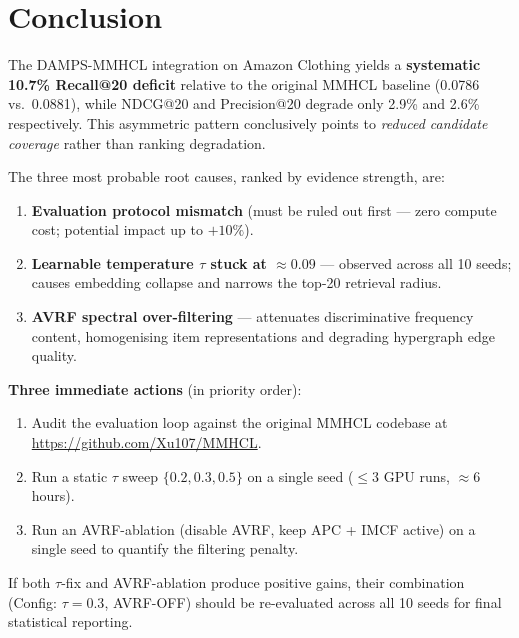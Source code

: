 \documentclass[12pt,a4paper]{article}
\begin{document}
\section{Conclusion}

The DAMPS-MMHCL integration on Amazon Clothing yields a
\textbf{systematic 10.7\% Recall@20 deficit} relative to the original
MMHCL baseline (0.0786 vs.\ 0.0881), while NDCG@20 and Precision@20
degrade only 2.9\% and 2.6\% respectively.  This asymmetric pattern
conclusively points to \emph{reduced candidate coverage} rather than
ranking degradation.

The three most probable root causes, ranked by evidence strength, are:

\begin{enumerate}[leftmargin=*]
  \item \textbf{Evaluation protocol mismatch} (must be ruled out first
        --- zero compute cost; potential impact up to $+10\%$).
  \item \textbf{Learnable temperature $\tau$ stuck at $\approx 0.09$}
        --- observed across all 10 seeds; causes embedding collapse and
        narrows the top-20 retrieval radius.
  \item \textbf{AVRF spectral over-filtering} --- attenuates
        discriminative frequency content, homogenising item
        representations and degrading hypergraph edge quality.
\end{enumerate}

\textbf{Three immediate actions} (in priority order):
\begin{enumerate}[leftmargin=*]
  \item Audit the evaluation loop against the original MMHCL codebase at
        \url{https://github.com/Xu107/MMHCL}.
  \item Run a static $\tau$ sweep $\{0.2, 0.3, 0.5\}$ on a single seed
        ($\leq 3$ GPU runs, $\approx 6$ hours).
  \item Run an AVRF-ablation (disable AVRF, keep APC + IMCF active) on
        a single seed to quantify the filtering penalty.
\end{enumerate}

If both $\tau$-fix and AVRF-ablation produce positive gains,
their combination (Config: $\tau = 0.3$, AVRF-OFF) should be
re-evaluated across all 10 seeds for final statistical reporting.
\end{document}
